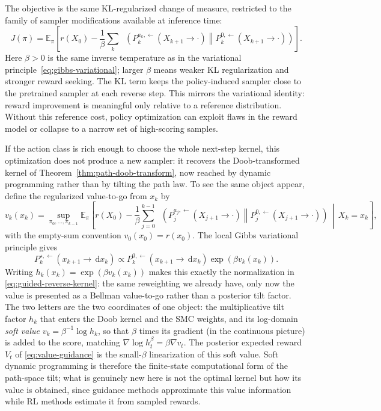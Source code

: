 \documentclass{amsart}
\numberwithin{equation}{section}
\theoremstyle{plain}
\theoremstyle{definition}
\theoremstyle{remark}
\DeclareMathOperator{\KL}{D_{\mathsf{KL}}}
\newcommand{\E}{\mathbb{E}}
\newcommand{\dd}{\,\mathrm{d}}
\begin{document}
The objective is the same KL-regularized change of measure, restricted to the
family of sampler modifications available at inference time:
\begin{equation}\label{eq:rl-kl-objective}
    J(\pi)
    =
    \E_{\pi}
    \left[
    r(X_0)
    -
    \frac1\beta\sum_k
    \KL\!\left(
    P_k^{a_k,\leftarrow}(X_{k+1}\to\cdot)
    \middle\|
    P_k^{0,\leftarrow}(X_{k+1}\to\cdot)
    \right)
    \right].
\end{equation}
Here $\beta>0$ is the same inverse temperature as in the variational
principle~\eqref{eq:gibbs-variational}; larger $\beta$ means weaker KL
regularization and stronger reward seeking.  The KL term keeps the
policy-induced sampler close to the pretrained sampler at each reverse step.
This mirrors the variational identity: reward improvement is meaningful only
relative to a reference distribution.  Without this reference cost, policy
optimization can exploit flaws in the reward model or collapse to a narrow set
of high-scoring samples.

If the action class is rich enough to choose the whole next-step kernel, this
optimization does not produce a new sampler: it recovers the Doob-transformed
kernel of Theorem~\ref{thm:path-doob-transform}, now reached by dynamic
programming rather than by tilting the path law.  To see the same object appear,
define the regularized value-to-go from $x_k$ by
\[
    v_k(x_k)
    =
    \sup_{\pi_0,\ldots,\pi_{k-1}}
    \E_{\pi}
    \left[
    r(X_0)
    -
    \frac1\beta\sum_{j=0}^{k-1}
    \KL\!\left(
    P_j^{a_j,\leftarrow}(X_{j+1}\to\cdot)
    \middle\|
    P_j^{0,\leftarrow}(X_{j+1}\to\cdot)
    \right)
    \,\middle|\, X_k=x_k
    \right],
\]
with the empty-sum convention $v_0(x_0)=r(x_0)$.  The local Gibbs variational
principle gives
\[
    P_k^{\star,\leftarrow}(x_{k+1}\to \dd x_k)
    \propto
    P_k^{0,\leftarrow}(x_{k+1}\to \dd x_k)
    \exp\left(\beta v_k(x_k)\right).
\]
Writing $h_k(x_k)=\exp(\beta v_k(x_k))$ makes this exactly the normalization
in \eqref{eq:guided-reverse-kernel}: the same reweighting we already have, only
now the value is presented as a Bellman value-to-go rather than a
posterior tilt factor.  The two letters are the two coordinates of one object:
the multiplicative tilt factor $h_k$ that enters the Doob kernel and the SMC
weights, and its log-domain \emph{soft value} $v_k=\beta^{-1}\log h_k$, so that
$\beta$ times its gradient (in the continuous picture) is added to the score,
matching $\nabla\log h_t^\beta=\beta\nabla v_t$.  The
posterior expected reward $V_t$ of \eqref{eq:value-guidance} is the small-$\beta$
linearization of this soft value.  Soft dynamic programming is therefore the finite-state
computational form of the path-space tilt; what is genuinely new here is not the
optimal kernel but how its value is obtained, since guidance methods approximate
this value information while RL methods estimate it from sampled rewards.
\end{document}
